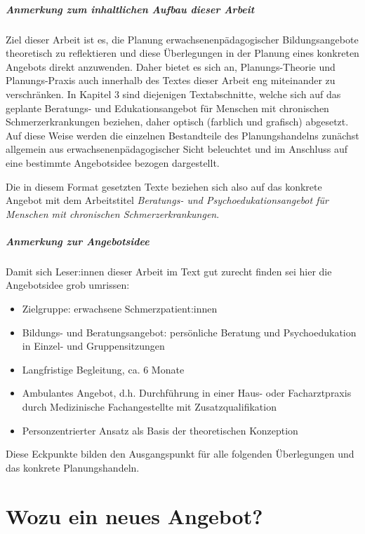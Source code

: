 \documentclass[
  twoside,
  parskip=half-,
]{scrreprt}
\begin{document}
\paragraph{Anmerkung zum inhaltlichen Aufbau dieser Arbeit} Ziel dieser Arbeit ist es, die Planung erwachsenenpädagogischer Bildungsangebote theoretisch zu reflektieren und diese Überlegungen in der Planung eines konkreten Angebots direkt anzuwenden. Daher bietet es sich an, Planungs-Theorie und Planungs-Praxis auch innerhalb des Textes dieser Arbeit eng miteinander zu verschränken. In Kapitel 3 sind diejenigen Textabschnitte, welche sich auf das geplante Beratungs- und Edukationsangebot für Menschen mit chronischen Schmerzerkrankungen beziehen, daher optisch (farblich und grafisch) abgesetzt. Auf diese Weise werden die einzelnen Bestandteile des Planungshandelns zunächst allgemein aus erwachsenenpädagogischer Sicht beleuchtet und im Anschluss auf eine bestimmte Angebotsidee bezogen dargestellt.
\begin{praxis}
  Die in diesem Format gesetzten Texte beziehen sich also auf das konkrete Angebot mit dem Arbeitstitel \textit{Beratungs- und Psychoedukationsangebot für Menschen mit chronischen Schmerzerkrankungen}.
\end{praxis}

\paragraph{Anmerkung zur Angebotsidee}

Damit sich Leser:innen dieser Arbeit im Text gut zurecht finden sei hier die Angebotsidee grob umrissen:
\begin{itemize}
  \item Zielgruppe: erwachsene Schmerzpatient:innen
  \item Bildungs- und Beratungsangebot: persönliche Beratung und Psychoedukation in Einzel- und Gruppensitzungen 
  \item Langfristige Begleitung, ca. 6 Monate
  \item Ambulantes Angebot, d.h. Durchführung in einer Haus- oder Facharztpraxis durch Medizinische Fachangestellte mit Zusatzqualifikation
  \item Personzentrierter Ansatz als Basis der theoretischen Konzeption
\end{itemize}

Diese Eckpunkte bilden den Ausgangspunkt für alle folgenden Überlegungen und das konkrete Planungshandeln.


\chapter{Wozu ein neues Angebot?}
\end{document}
